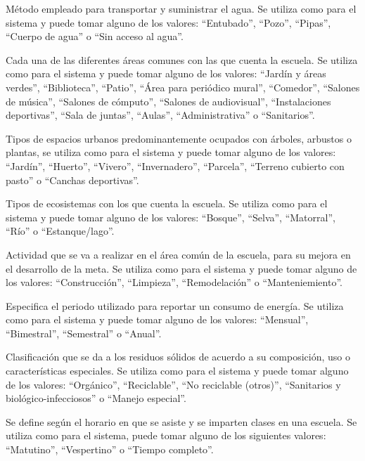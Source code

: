\begin{description}
     Método empleado para transportar y suministrar el agua. Se utiliza como  para el sistema y puede tomar alguno de los valores: ``Entubado'', ``Pozo'', ``Pipas'', ``Cuerpo de agua'' o ``Sin acceso al agua''.

     Cada una de las diferentes áreas comunes con las que cuenta la escuela. Se utiliza como  para el sistema y puede tomar alguno de los valores: ``Jardín y áreas verdes'', ``Biblioteca'', ``Patio'', ``Área para periódico mural'', ``Comedor'', ``Salones de música'', ``Salones de cómputo'', ``Salones de audiovisual'', ``Instalaciones deportivas'', ``Sala de juntas'', ``Aulas'', ``Administrativa'' o ``Sanitarios''.
 
     Tipos de espacios urbanos predominantemente ocupados con árboles, arbustos o plantas, se utiliza como  para el sistema y puede tomar alguno de los valores: ``Jardín'', ``Huerto'', ``Vivero'', ``Invernadero'', ``Parcela'', ``Terreno cubierto con pasto'' o ``Canchas deportivas''.

     Tipos de ecosistemas con los que cuenta la escuela. Se utiliza como  para el sistema y puede tomar alguno de los valores: ``Bosque'', ``Selva'', ``Matorral'', ``Río'' o ``Estanque/lago''.

     Actividad que se va a realizar en el área común de la escuela, para su mejora en el desarrollo de la meta. Se utiliza como  para el sistema y puede tomar alguno de los valores: ``Construcción'', ``Limpieza'', ``Remodelación'' o ``Manteniemiento''.

     Especifica el periodo utilizado para reportar un consumo de energía. Se utiliza como  para el sistema y puede tomar alguno de los valores: ``Mensual'', ``Bimestral'', ``Semestral'' o ``Anual''.

     Clasificación que se da a los residuos sólidos de acuerdo a su composición, uso o características especiales. Se utiliza como  para el sistema y puede tomar alguno de los valores: ``Orgánico'', ``Reciclable'', ``No reciclable (otros)'', ``Sanitarios y biológico-infecciosos'' o ``Manejo especial''.

     Se define según el horario en que se asiste y se imparten clases en una escuela. Se utiliza como  para el sistema, puede tomar alguno de los siguientes valores:
    ``Matutino'', ``Vespertino'' o ``Tiempo completo''.

\end{description}
